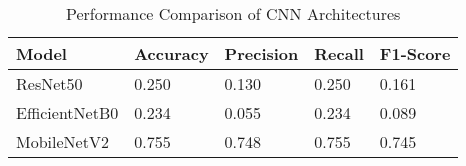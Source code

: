 \begin{table}[h]
\centering
\caption{Performance Comparison of CNN Architectures}
\label{tab:model_comparison}
\begin{tabular}{lllll}
\toprule
Model & Accuracy & Precision & Recall & F1-Score \\
\midrule
ResNet50 & 0.250 & 0.130 & 0.250 & 0.161 \\
EfficientNetB0 & 0.234 & 0.055 & 0.234 & 0.089 \\
MobileNetV2 & 0.755 & 0.748 & 0.755 & 0.745 \\
\bottomrule
\end{tabular}
\end{table}
